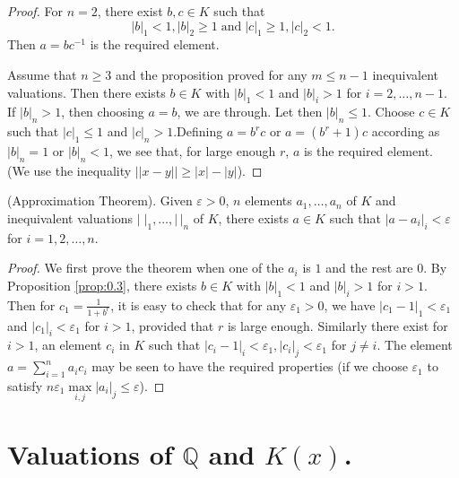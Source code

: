 \begin{proof}
For $n=2$, there exist $b, c\in K$ such that 
$$
|b|_1<1, |b|_2\geq 1\;\text{and}\; |c|_1\geq 1, |c|_2<1.
$$
Then $a=b c^{-1}$ is the required element.

Assume that $n\geq 3$ and the proposition proved for any $m\leq n-1$ 
inequivalent valuations. Then there exists $b\in K$ with $|b|_1<1$ and 
$|b|_i>1$ for $i=2,\ldots, n-1$. If $|b|_n>1$, then choosing $a=b$, we 
are through. Let then $|b|_n\leq 1$. Choose $c\in K$ such that 
$|c|_1\leq 1$ and $|c|_n>1$.\pageoriginale Defining $a=b^r c$ or 
$a=(b^r+1)c$ according as $|b|_n=1$ or $|b|_n<1$, we see that, for 
large enough $r$, $a$ is the required element. (We use the inequality 
$||x-y||\geq |x|-|y|$).
\end{proof}

\setcounter{theorem}{3}
\begin{theorem}\label{thm:0.4}
(Approximation Theorem). Given $\varepsilon >0$, $n$ elements 
$a_1,\ldots,a_n$ of $K$ and inequivalent valuations 
$|\;|_1,\ldots,|\,|_n$ of $K$, there exists $a\in K$ such that 
$|a-a_i|_i<\varepsilon$ for $i=1, 2,\ldots,n$.
\end{theorem}

\begin{proof}
We first prove the theorem when one of the $a_i$ is $1$ and the rest 
are $0$. By Proposition \ref{prop:0.3}, there exists $b\in K$ with 
$|b|_1<1$ and $|b|_i>1$ for $i>1$. Then for $c_1=\frac{1}{1+ 
b^r}$, it is easy to check that for any $\varepsilon_1>0$, we have 
$|c_1-1|_1<\varepsilon_1$ and $|c_1|_i<\varepsilon_1$ for $i>1$, 
provided that $r$ is large enough. Similarly there exist for $i>1$, 
an element $c_i$ in $K$ such that $|c_i-1|_i<\varepsilon_1, 
|c_i|_j<\varepsilon_1$ for $j\neq i$. The element 
$a=\sum\limits_{i=1}^{n} 
a_i c_i$ may be seen to have the required properties (if we choose 
$\varepsilon_1$ to satisfy $n\varepsilon_1 
\max\limits_{i,j}|a_i|_j\leq\varepsilon$).
\end{proof}

\section{Valuations of $\mathbb{Q}$ and $K(x)$.}\label{sec0.3}

